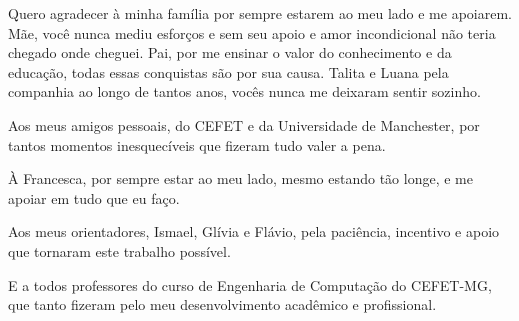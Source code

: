 
\begin{agradecimentos}

Quero agradecer à minha família por sempre estarem ao meu lado e me apoiarem. Mãe, você
nunca mediu esforços e sem seu apoio e amor incondicional não teria chegado onde cheguei. 
Pai, por me ensinar o valor do conhecimento e da educação, todas essas conquistas são por sua 
causa. Talita e Luana pela companhia ao longo de tantos anos, vocês nunca me deixaram sentir 
sozinho.

Aos meus amigos pessoais, do CEFET e da Universidade de Manchester, por tantos momentos 
inesquecíveis que fizeram tudo valer a pena.

À Francesca, por sempre estar ao meu lado, mesmo estando tão longe, e me apoiar em 
tudo que eu faço.

Aos meus orientadores, Ismael, Glívia e Flávio, pela paciência, incentivo e apoio que tornaram 
este trabalho possível.

E a todos professores do curso de Engenharia de Computação do CEFET-MG, que tanto fizeram
pelo meu desenvolvimento acadêmico e profissional.

\end{agradecimentos}
